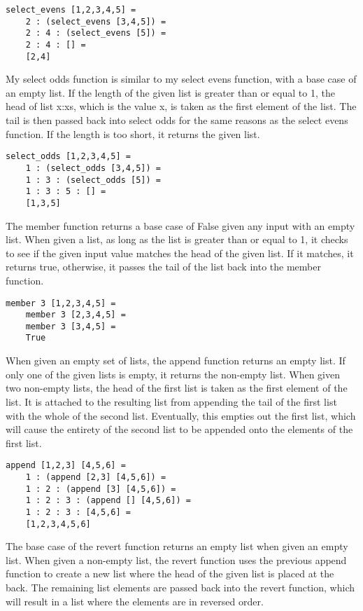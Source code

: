 \documentclass{article}
\theoremstyle{theorem}
\theoremstyle{definition}
\theoremstyle{remark}
\begin{document}
\begin{lstlisting}
select_evens [1,2,3,4,5] =
	2 : (select_evens [3,4,5]) =
	2 : 4 : (select_evens [5]) =
	2 : 4 : [] =
	[2,4]
\end{lstlisting}
%
My select odds function is similar to my select evens function, with a base case of an empty list. If the length of the given list is greater than or equal to 1, the head of list x:xs, which is the value x, is taken as the first element of the list. The tail is then passed back into select odds for the same reasons as the select evens function. If the length is too short, it returns the given list.

\begin{lstlisting}
select_odds [1,2,3,4,5] =
	1 : (select_odds [3,4,5]) =
	1 : 3 : (select_odds [5]) =
	1 : 3 : 5 : [] =
	[1,3,5]
\end{lstlisting}
%
The member function returns a base case of False given any input with an empty list. When given a list, as long as the list is greater than or equal to 1, it checks to see if the given input value matches the head of the given list. If it matches, it returns true, otherwise, it passes the tail of the list back into the member function.

\begin{lstlisting}
member 3 [1,2,3,4,5] =
	member 3 [2,3,4,5] =
	member 3 [3,4,5] =
	True
\end{lstlisting}
%
When given an empty set of lists, the append function returns an empty list. If only one of the given lists is empty, it returns the non-empty list. When given two non-empty lists, the head of the first list is taken as the first element of the list. It is attached to the resulting list from appending the tail of the first list with the whole of the second list. Eventually, this empties out the first list, which will cause the entirety of the second list to be appended onto the elements of the first list.

\begin{lstlisting}
append [1,2,3] [4,5,6] =
	1 : (append [2,3] [4,5,6]) =
	1 : 2 : (append [3] [4,5,6]) =
	1 : 2 : 3 : (append [] [4,5,6]) =
	1 : 2 : 3 : [4,5,6] =
	[1,2,3,4,5,6]
\end{lstlisting}
%
The base case of the revert function returns an empty list when given an empty list. When given a non-empty list, the revert function uses the previous append function to create a new list where the head of the given list is placed at the back. The remaining list elements are passed back into the revert function, which will result in a list where the elements are in reversed order.
\end{document}
